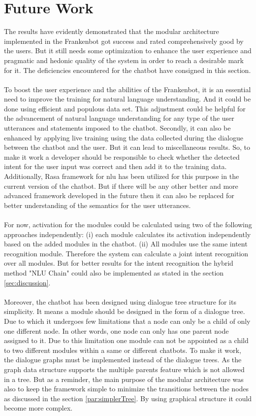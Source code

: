 \section{Future Work}
The results have evidently demonstrated that the modular architecture implemented in the Frankenbot got success and rated comprehensively good by the users. But it still needs some optimization to enhance the user experience and pragmatic and hedonic quality of the system in order to reach a desirable mark for it. The deficiencies encountered for the chatbot have consigned in this section.
\\~\\
To boost the user experience and the abilities of the Frankenbot, it is an essential need to improve the training for natural language understanding. And it could be done using efficient and populous data set. This adjustment could be helpful for the advancement of natural language understanding for any type of the user utterances and statements imposed to the chatbot. Secondly, it can also be enhanced by applying live training using the data collected during the dialogue between the chatbot and the user. But it can lead to miscellaneous results. So, to make it work a developer should be responsible to check whether the detected intent for the user input was correct and then add it to the training data. Additionally, Rasa framework for nlu has been utilized for this purpose in the current version of the chatbot. But if there will be any other better and more advanced framework developed in the future then it can also be replaced for better understanding of the semantics for the user utterances.
\\~\\
For now, activation for the modules could be calculated using two of the following approaches independently: (i) each module calculates its activation independently based on the added modules in the chatbot. (ii) All modules use the same intent recognition module. Therefore the system can calculate a joint intent recognition over all modules. But for better results for the intent recognition the hybrid method "NLU Chain" could also be implemented as stated in the section \ref{sec:discussion}. 
\\~\\
Moreover, the chatbot has been designed using dialogue tree structure for its simplicity. It means a module should be designed in the form of a dialogue tree. Due to which it undergoes few limitations that a node can only be a child of only one different node. In other words, one node can only has one parent node assigned to it. Due to this limitation one module can not be appointed as a child to two different modules within a same or different chatbots. To make it work, the dialogue graphs must be implemented instead of the dialogue trees. As the graph data structure supports the multiple parents feature which is not allowed in a tree. But as a reminder, the main purpose of the modular architecture was also to keep the framework simple to minimize the transitions between the nodes as discussed in the section \ref{par:simplerTree}. By using graphical structure it could become more complex.
